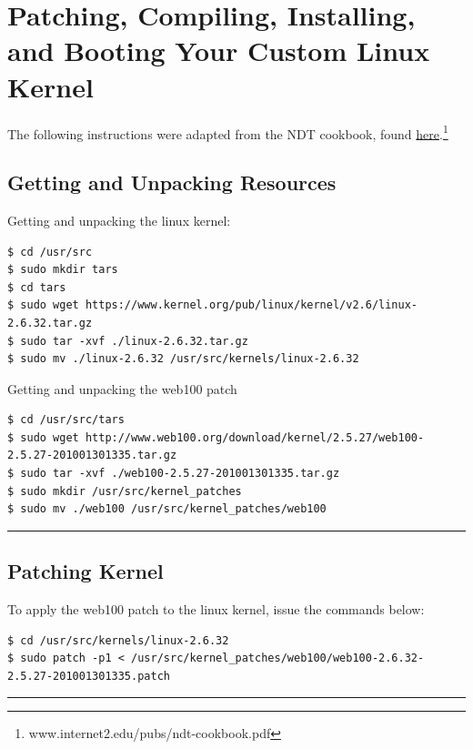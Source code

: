 \section{Patching, Compiling, Installing, and Booting Your Custom Linux Kernel}
The following instructions were adapted from the NDT cookbook, found \href{www.internet2.edu/pubs/ndt-cookbook.pdf‎}{here}.\footnote{www.internet2.edu/pubs/ndt-cookbook.pdf‎}

\subsection{Getting and Unpacking Resources}
Getting and unpacking the linux kernel: 
\begin{snugshade}\begin{verbatim}
$ cd /usr/src
$ sudo mkdir tars
$ cd tars
$ sudo wget https://www.kernel.org/pub/linux/kernel/v2.6/linux-2.6.32.tar.gz
$ sudo tar -xvf ./linux-2.6.32.tar.gz
$ sudo mv ./linux-2.6.32 /usr/src/kernels/linux-2.6.32
\end{verbatim}\end{snugshade}\noindent
Getting and unpacking the web100 patch
\begin{snugshade}\begin{verbatim}
$ cd /usr/src/tars
$ sudo wget http://www.web100.org/download/kernel/2.5.27/web100-2.5.27-201001301335.tar.gz
$ sudo tar -xvf ./web100-2.5.27-201001301335.tar.gz
$ sudo mkdir /usr/src/kernel_patches
$ sudo mv ./web100 /usr/src/kernel_patches/web100
\end{verbatim}\end{snugshade}\noindent

\hrule


\subsection{Patching Kernel}
To apply the web100 patch to the linux kernel, issue the commands below:
\begin{snugshade}\begin{verbatim}
$ cd /usr/src/kernels/linux-2.6.32
$ sudo patch -p1 < /usr/src/kernel_patches/web100/web100-2.6.32-2.5.27-201001301335.patch 
\end{verbatim}\end{snugshade}\noindent

\hrule

